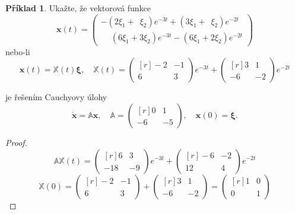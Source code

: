 \documentclass[a4paper, 12pt]{book}
\theoremstyle{definition}
\newtheorem{example}[theorem]{Příklad}
\def\vc#1{\mathbf{\boldsymbol{#1}}}     %
\def\tn#1{{\mathbb{#1}}}    %
\begin{document}
\begin{example}
Ukažte, že vektorová funkce
\[
\vc x(t) = 
\begin{pmatrix}
-(2\xi_1 + \phantom{3}\xi_2)e^{-3t}+(3\xi_1 + \phantom{2}\xi_2)e^{-2t}\\
\phantom{-}(6\xi_1 + 3\xi_2)e^{-3t}-(6\xi_1 + 2\xi_2)e^{-2t}
\end{pmatrix}
\]
nebo-li
\[
\vc x(t)= \tn X(t) \vc \xi,\quad
\tn X(t)=
\begin{pmatrix*}[r]
 -2 &-1\\
  6 & 3
\end{pmatrix*}
e^{-3t}
+
\begin{pmatrix*}[r]
  3 & 1\\
  -6 & -2
\end{pmatrix*}
e^{-2t}
\]

je řešením Cauchyovy úlohy
\[
\dot{\vc x} = \tn A \vc x, \quad
\tn A = 
\begin{pmatrix*}[r]
0 & 1\\
-6 & -5
\end{pmatrix*}, \quad
\vc x(0) = \vc \xi.
\]
\end{example}
\begin{proof}
\[
\tn A \tn X(t) =
\begin{pmatrix*}[r]
 6 &3\\
  -18 &-9
\end{pmatrix*}
e^{-3t}
+
\begin{pmatrix*}[r]
 -6 & -2\\
  12 & 4
\end{pmatrix*}
e^{-2t}
\]
\[
  \tn X(0) = 
\begin{pmatrix*}[r]
 -2 &-1\\
  6 & 3
\end{pmatrix*}
+
\begin{pmatrix*}[r]
  3 & 1\\
  -6 & -2
\end{pmatrix*}
=
\begin{pmatrix*}[r]
  1 & 0\\
  0 & 1
\end{pmatrix*}
\]
\end{proof}
\end{document}

